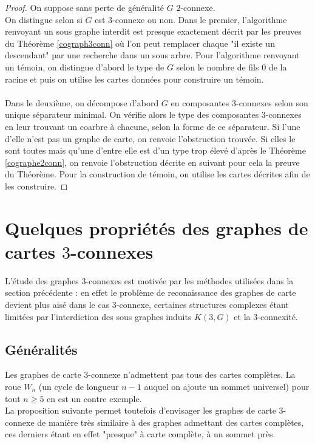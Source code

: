 \documentclass{scrartcl}
\begin{document}
\begin{flushleft}
\begin{proof}
    On suppose sans perte de généralité $G$ $2$-connexe.\\
    On distingue selon si $G$ est $3$-connexe ou non. Dans le premier, l'algorithme renvoyant un sous graphe interdit est presque exactement
    décrit par les preuves du Théorème \ref{cograph3conn} où l'on peut remplacer chaque "il existe un descendant" par une recherche dans
    un sous arbre. Pour l'algorithme renvoyant un témoin, on distingue d'abord le type de $G$ selon le nombre de fils $0$ de la
    racine et puis on utilise les cartes données pour construire un témoin.
    \\~\\
    Dans le deuxième, on décompose d'abord $G$ en composantes $3$-connexes selon son unique séparateur minimal. On vérifie alors
    le type des composantes $3$-connexes en leur trouvant un coarbre à chacune, selon la forme de ce séparateur. Si l'une d'elle
    n'est pas un graphe de carte, on renvoie l'obstruction trouvée. Si elles le sont toutes mais qu'une d'entre elle est d'un
    type trop élevé d'après le Théorème \ref{cographe2conn}, on renvoie l'obstruction décrite en suivant pour cela la preuve du
    Théorème. Pour la construction de témoin, on utilise les cartes décrites afin de les construire.
\end{proof}

\section{Quelques propriétés des graphes de cartes $3$-connexes}

L'étude des graphes $3$-connexes est motivée par les méthodes utilisées dans la section précédente : en effet le problème de
reconaissance des graphes de carte devient plus aisé dans le cas $3$-connexe, certaines structures complexes étant limitées
par l'interdiction des sous graphes induits $K(3, G)$ et la $3$-connexité.

\subsection{Généralités}

Les graphes de carte $3$-connexe n'admettent pas tous des cartes complètes. La roue $W_n$ (un cycle de longueur $n-1$ auquel on ajoute un
sommet universel) pour tout $n \geq 5$ en est un contre exemple.\\
La proposition suivante permet toutefois d'envisager les graphes de carte $3$-connexe de manière très similaire à des graphes admettant
des cartes complètes, ces derniers étant en effet "presque" à carte complète, à un sommet près.


\end{flushleft}
\end{document}
